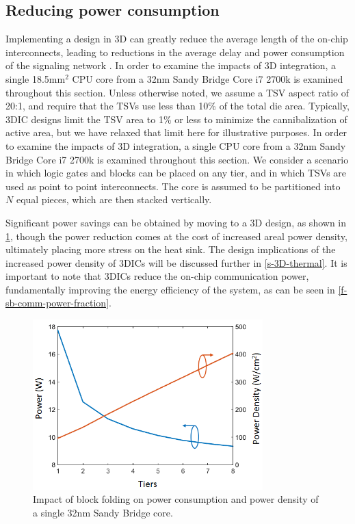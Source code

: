 \documentclass[journal,twoside]{IEEEtran}
\begin{document}
\subsection{Reducing power consumption}
Implementing a design in 3D can greatly reduce the average length of the on-chip interconnects,
leading to reductions in the average delay and power consumption of the signaling network \cite{joyner_impact_2001}.
In order to examine the impacts of 3D integration, a single 18.5mm$^2$ CPU core from a 32nm Sandy Bridge Core i7 2700k
is examined throughout this section.
Unless otherwise noted, we assume a TSV aspect ratio of 20:1, and require that the TSVs use
less than 10\% of the total die area. Typically, 3DIC designs limit the TSV area to 1\% or less
to minimize the cannibalization of active area, but we have relaxed that limit here for illustrative purposes.
In order to examine the impacts of 3D integration, a single CPU core from a 32nm Sandy Bridge Core i7 2700k
is examined throughout this section. We consider a scenario in which logic gates and blocks can be placed on
any tier, and in which TSVs are used as point to point interconnects.
The core is assumed to be partitioned into $N$ equal pieces, which are then stacked vertically.

Significant power savings can be obtained by moving to a 3D design, as shown in \cref{f-sb-power-vs-tiers-ild},
though the power reduction comes at the cost of increased areal power density, ultimately placing more
stress on the heat sink. The design implications of the increased power density of 3DICs will be discussed further
in \cref{s-3D-thermal}. It is important to note that 3DICs reduce the on-chip communication power, fundamentally 
improving the 
energy efficiency of the system, as can be seen in \cref{f-sb-comm-power-fraction}.

\begin{figure}[tb]
	\centering
	\includegraphics[width=3.5in]{Figures/sb3d_power_and_pdens2.png}
	\caption{Impact of block folding on power consumption and power density of a single 32nm Sandy Bridge core.}
	\label{f-sb-power-vs-tiers-ild}
\end{figure}
\end{document}
